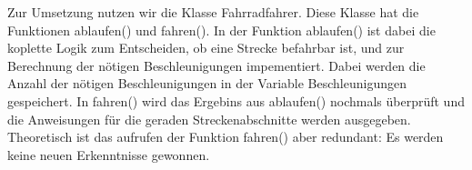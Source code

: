 
	Zur Umsetzung nutzen wir die Klasse Fahrradfahrer.
	Diese Klasse hat die Funktionen ablaufen() und fahren().
	In der Funktion ablaufen() ist dabei die koplette Logik zum Entscheiden, ob eine Strecke befahrbar ist, und zur Berechnung der nötigen Beschleunigungen impementiert. 
	Dabei werden die Anzahl der nötigen Beschleunigungen in der Variable Beschleunigungen gespeichert.
	In fahren() wird das Ergebins aus ablaufen() nochmals überprüft und die Anweisungen für die geraden Streckenabschnitte werden ausgegeben. 
	Theoretisch ist das aufrufen der Funktion fahren() aber redundant: Es werden keine neuen Erkenntnisse gewonnen.
	
